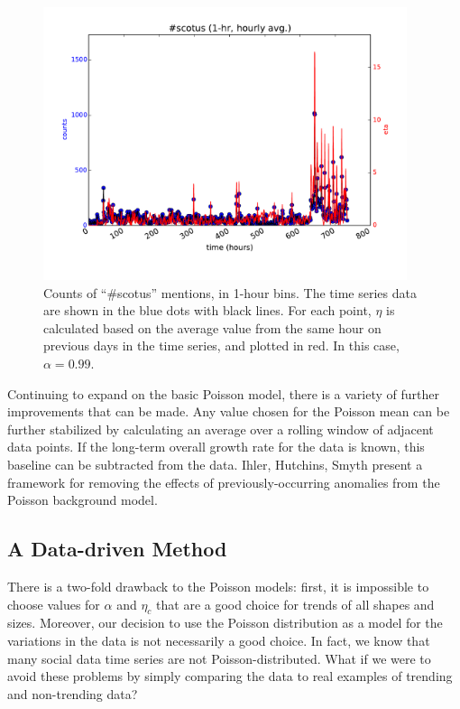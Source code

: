 \documentclass{article}
\begin{document}
\begin{figure}
\begin{center}
\includegraphics[width=0.95\textwidth]{fig/scotus_1month_ccpm.pdf}
\caption{Counts of ``\#scotus'' mentions, in 1-hour bins. The time series
data are shown in the blue dots with black lines. For each point, $\eta$ is
calculated based on the average value from the same hour on previous days
in the time series, and plotted in red. In this case, $\alpha=0.99$. }
\label{fig:scotus4}
\end{center}
\end{figure}

Continuing to expand on the basic Poisson model, there is a variety of
further improvements that can be made. Any value chosen for the Poisson
mean can be further stabilized by calculating an average over a rolling
window of adjacent data points. If the long-term overall growth rate for
the data is known, this baseline can be subtracted from the
data. Ihler, Hutchins, Smyth \cite{Ihler:2006} present a
framework for removing the effects of previously-occurring anomalies from
the Poisson background model. 



\subsection{A Data-driven Method} 
\label{nikolov}

There is a two-fold drawback to the Poisson models: first, it is impossible to
choose values for $\alpha$ and $\eta_c$ that are a good choice for trends of all shapes
and sizes. Moreover, our decision to use the Poisson distribution as a model
for the variations in the data is not necessarily a good choice. In fact, we
know that many social data time series are not Poisson-distributed. What if we
were to avoid these problems by simply comparing the data to real examples of
trending and non-trending data?
\end{document}
